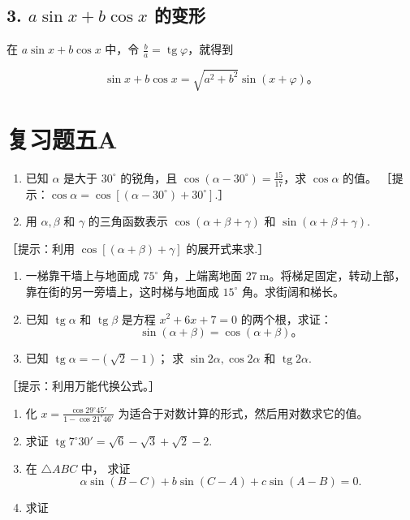 \subsection{\texorpdfstring{3. \(a \sin x + b \cos x\) 的变形}{3. a \textbackslash sin x + b \textbackslash cos x 的变形}}\label{a-sin-x-b-cos-x-ux7684ux53d8ux5f62-1}

在 \(a\sin x + b\cos x\) 中，令
\(\frac{b}{a} = \operatorname{tg}\varphi\)，就得到

\[
\sin x + b \cos x = \sqrt {a ^ {2} + b ^ {2}} \sin (x + \varphi)\text{。}
\]

\section{复习题五A}

\begin{enumerate}
\item
  已知 \(\alpha\) 是大于 \(30^{\circ}\) 的锐角，且
  \(\cos (\alpha - 30^{\circ}) = \frac{15}{17}\)，求 \(\cos \alpha\)
  的值。
  ［提示：\(\cos \alpha = \cos [(\alpha - 30^{\circ}) + 30^{\circ}]\).］
\item
  用 \(\alpha, \beta\) 和 \(\gamma\) 的三角函数表示
  \(\cos (\alpha + \beta + \gamma)\) 和
  \(\sin (\alpha + \beta + \gamma)\).
\end{enumerate}

［提示：利用 \(\cos[(\alpha+\beta)+\gamma]\) 的展开式来求.］

\begin{enumerate}[start=3]
\item
  一梯靠干墙上与地面成 \(75^{\circ}\) 角，上端离地面
  \(27 \mathrm{~m}\)。将梯足固定，转动上部，靠在街的另一旁墙上，这时梯与地面成
  \(15^{\circ}\) 角。求街阔和梯长。
\item
  已知 \(\operatorname{tg} \alpha\) 和 \(\operatorname{tg} \beta\)
  是方程 \(x^{2} + 6x + 7 = 0\) 的两个根，求证：
\[
\sin (\alpha + \beta) = \cos (\alpha + \beta)\text{。}
\]
\item
  已知 \(\operatorname{tg} \alpha = -(\sqrt{2} - 1)\)； 求
  \(\sin 2\alpha, \cos 2\alpha\) 和 \(\operatorname{tg} 2\alpha\).
\end{enumerate}

［提示：利用万能代换公式。］

\begin{enumerate}[start=6]
\item
  化 \(x = \frac{\cos 29^{\circ}45'}{1 - \cos 21^{\circ}46'}\)
  为适合于对数计算的形式，然后用对数求它的值。
\item
  求证
  \(\operatorname{tg} 7^{\circ} 30' = \sqrt{6} - \sqrt{3} + \sqrt{2} - 2\).
\item
  在 \(\triangle ABC\) 中， 求证
\[
\alpha \sin (B - C) + b \sin (C - A) + c \sin (A - B) = 0.
\]
\item
  求证
\end{enumerate}


